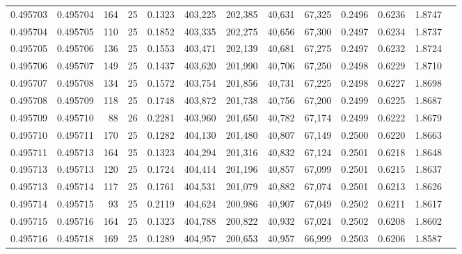 \begin{tabular}{rrrrrrrrrrrrr}
0.495703 & 0.495704 &   164 &  25 &                                     0.1323 & 403,225 & 202,385 &  40,631 &  67,325 & 0.2496 & 0.6236 & 1.8747 \\
0.495704 & 0.495705 &   110 &  25 &                                     0.1852 & 403,335 & 202,275 &  40,656 &  67,300 & 0.2497 & 0.6234 & 1.8737 \\
0.495705 & 0.495706 &   136 &  25 &                                     0.1553 & 403,471 & 202,139 &  40,681 &  67,275 & 0.2497 & 0.6232 & 1.8724 \\
0.495706 & 0.495707 &   149 &  25 &                                     0.1437 & 403,620 & 201,990 &  40,706 &  67,250 & 0.2498 & 0.6229 & 1.8710 \\
0.495707 & 0.495708 &   134 &  25 &                                     0.1572 & 403,754 & 201,856 &  40,731 &  67,225 & 0.2498 & 0.6227 & 1.8698 \\
0.495708 & 0.495709 &   118 &  25 &                                     0.1748 & 403,872 & 201,738 &  40,756 &  67,200 & 0.2499 & 0.6225 & 1.8687 \\
0.495709 & 0.495710 &    88 &  26 &                                     0.2281 & 403,960 & 201,650 &  40,782 &  67,174 & 0.2499 & 0.6222 & 1.8679 \\
0.495710 & 0.495711 &   170 &  25 &                                     0.1282 & 404,130 & 201,480 &  40,807 &  67,149 & 0.2500 & 0.6220 & 1.8663 \\
0.495711 & 0.495713 &   164 &  25 &                                     0.1323 & 404,294 & 201,316 &  40,832 &  67,124 & 0.2501 & 0.6218 & 1.8648 \\
0.495713 & 0.495713 &   120 &  25 &                                     0.1724 & 404,414 & 201,196 &  40,857 &  67,099 & 0.2501 & 0.6215 & 1.8637 \\
0.495713 & 0.495714 &   117 &  25 &                                     0.1761 & 404,531 & 201,079 &  40,882 &  67,074 & 0.2501 & 0.6213 & 1.8626 \\
0.495714 & 0.495715 &    93 &  25 &                                     0.2119 & 404,624 & 200,986 &  40,907 &  67,049 & 0.2502 & 0.6211 & 1.8617 \\
0.495715 & 0.495716 &   164 &  25 &                                     0.1323 & 404,788 & 200,822 &  40,932 &  67,024 & 0.2502 & 0.6208 & 1.8602 \\
0.495716 & 0.495718 &   169 &  25 &                                     0.1289 & 404,957 & 200,653 &  40,957 &  66,999 & 0.2503 & 0.6206 & 1.8587 \\

\end{tabular}
